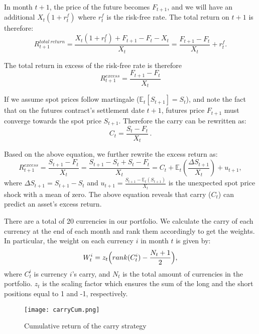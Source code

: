 \documentclass[12pt,a4paper]{article}
\begin{document}
In month ${t+1}$, the price of the future becomes $F_{t+1}$, and we will have an additional $X_{t}(1+r_{t}^{f})$ 
where $r_{t}^{f}$ is the risk-free rate. The total return on $t+1$ is therefore:
\begin{equation}
	R_{t+1}^{total \ return} = \frac{X_{t}(1+r_{t}^{f})+F_{t+1}-F_{t}-X_{t}}{X_{t}} =	\frac{F_{t+1}-F_{t}}{X_{t}}+r_{t}^{f}.
\end{equation}

The total return in excess of the risk-free rate is therefore
\begin{equation}
	R_{t+1}^{excess} = \frac{F_{t+1}-F_{t}}{X_{t}}
\end{equation}
 
If we assume spot prices follow martingale ($\mathbb{E}_{t}[S_{t+1}] = S_{t}$), and note the fact that on the futures contract's settlement date $t+1$, 
futures price $F_{t+1}$ must converge towards the spot price $S_{t+1}$. Therefore the carry can be rewritten as:
\begin{equation}
	C_{t} = \frac{S_{t}-F_{t}}{X_{t}}\,.
\end{equation}

Based on the above equation, we further rewrite the excess return as:
\begin{equation}
	R_{t+1}^{excess} = \frac{S_{t+1}-F_{t}}{X_{t}} = \frac{S_{t+1}-S_{t}+S_{t}-F_{t}}{X_{t}} = C_{t}+\mathbb{E}_{t}(\frac{\Delta{S_{t+1}}}{X_{t}})+u_{t+1},
\end{equation}
where $\Delta{S_{t+1}}=S_{t+1}-S_{t}$ and $u_{t+1} = \frac{S_{t+1}-\mathbb{E}_{t}(S_{t+1})}{X_{t}}$ is the unexpected spot price shock with a mean of zero.
The above equation reveals that carry ($C_{t}$) can predict an asset's excess return.

There are a total of 20 currencies in our portfolio. We calculate the carry of each currency at the end of each month and
rank them accordingly to get the weights. In particular, the weight on each currency $i$ in month $t$ is given by:
$$ W_{t}^{i} = z_{t} \Bigl( rank(C_{t}^{i})-\frac{N_{t}+1}{2}  \Bigr), $$ where $C_{t}^{i}$ is currency $i$'s carry, 
and $N_{t}$ is the total amount of currencies in 
the portfolio. $z_{t}$ is the scaling factor which ensures the sum of the long and the short positions equal to 1 and -1, respectively.  

\begin{figure}
	\texttt{[image: carryCum.png]}
	\caption{Cumulative return of the carry strategy}
\label{fig:cumRet}
\end{figure}
\end{document}
